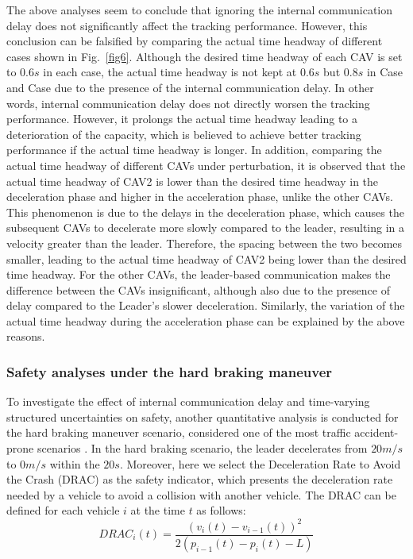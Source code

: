 \documentclass[journal]{IEEEtran}
\begin{document}
The above analyses seem to conclude that ignoring the internal communication delay does not significantly affect the tracking performance. However, this conclusion can be falsified by comparing the actual time headway of different cases shown in Fig.~\ref{fig6}. Although the desired time headway of each CAV is set to $0.6s$ in each case, the actual time headway is not kept at $0.6s$ but $0.8s$ in Case \uppercase\expandafter{} and Case \uppercase\expandafter{} due to the presence of the internal communication delay. In other words, internal communication delay does not directly worsen the tracking performance. However, it prolongs the actual time headway leading to a deterioration of the capacity, which is believed to achieve better tracking performance if the actual time headway is longer. In addition, comparing the actual time headway of different CAVs under perturbation, it is observed that the actual time headway of CAV2 is lower than the desired time headway in the deceleration phase and higher in the acceleration phase, unlike the other CAVs. This phenomenon is due to the delays in the deceleration phase, which causes the subsequent CAVs to decelerate more slowly compared to the leader, resulting in a velocity greater than the leader. Therefore, the spacing between the two becomes smaller, leading to the actual time headway of CAV2 being lower than the desired time headway. For the other CAVs, the leader-based communication makes the difference between the CAVs insignificant, although also due to the presence of delay compared to the Leader's slower deceleration. Similarly, the variation of the actual time headway during the acceleration phase can be explained by the above reasons.
\subsubsection{Safety analyses under the hard braking maneuver}
\label{Section 5.2.2}

To investigate the effect of internal communication delay and time-varying structured uncertainties on safety, another quantitative analysis is conducted for the hard braking maneuver scenario, considered one of the most traffic accident-prone scenarios \citep{Taheri1990,Saito2016,zhang2015all}. In the hard braking scenario, the leader decelerates from $20m/s$ to $0m/s$ within the $20s$. Moreover, here we select the Deceleration Rate to Avoid the Crash (DRAC) as the safety indicator, which presents the deceleration rate needed by a vehicle to avoid a collision with another vehicle. The DRAC can be defined for each vehicle $i$ at the time $t$ as follows:
\begin{equation*}
  DRAC{_i}(t) = \frac{{{{\left( {{v_i}(t) - {v_{i - 1}}(t)} \right)}^2}}}{{2\left( {{p_{i - 1}}(t) - {p_i}(t) - L} \right)}}
\end{equation*}
\end{document}
